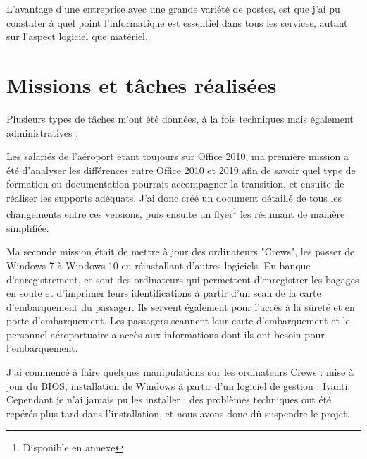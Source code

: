 L'avantage d'une entreprise avec une grande variété de postes, est que j'ai pu constater à quel point l'informatique est essentiel dans tous les services, autant sur l'aspect logiciel que matériel.

\newpage

\section{Missions et tâches réalisées}

Plusieurs types de tâches m’ont été données, à la fois techniques mais également administratives :


Les salariés de l’aéroport étant toujours sur Office 2010, ma première mission a été d’analyser les différences entre Office 2010 et 2019 afin de savoir quel type de formation ou documentation pourrait accompagner la transition, et ensuite de réaliser les supports adéquats. J’ai donc créé un document détaillé de tous les changements entre ces versions, puis ensuite un flyer\footnote{Disponible en annexe} les résumant de manière simplifiée.\newline

Ma seconde mission était de mettre à jour des ordinateurs "Crews", les passer de Windows 7 à Windows 10 en réinstallant d’autres logiciels. En banque d’enregistrement, ce sont des ordinateurs qui permettent d’enregistrer les bagages en soute et d’imprimer leurs identifications à partir d’un scan de la carte d’embarquement du passager. Ils servent également pour l’accès à la sûreté et en porte d’embarquement. Les passagers scannent leur carte d’embarquement et le personnel aéroportuaire a accès aux informations dont ils ont besoin pour l’embarquement.

J’ai commencé à faire quelques manipulations sur les ordinateurs Crews : mise à jour du BIOS, installation de Windows à partir d’un logiciel de gestion : Ivanti. Cependant je n’ai jamais pu les installer : des problèmes techniques ont été repérés plus tard dans l’installation, et nous avons donc dû suspendre le projet.

